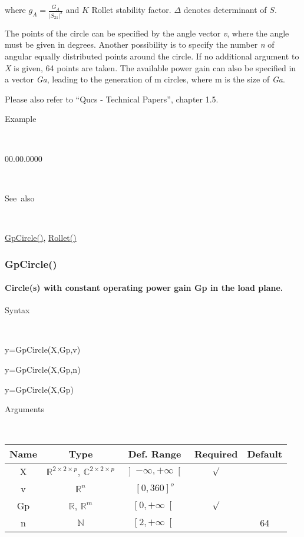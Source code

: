\medskip{}
where $g_{A}={\displaystyle \frac{G_{A}}{\left|S_{21}\right|^{2}}}$
and $K$ Rollet stability factor. $\Delta$ denotes determinant of
$S$.
\medskip{}

\noindent The points of the circle can be specified by the angle vector
\textit{v}, where the angle must be given in degrees. Another possibility
is to specify the number \textit{n} of angular equally distributed
points around the circle. If no additional argument to \textit{X}
is given, 64 points are taken. The available power gain can also be
specified in a vector \textit{Ga}, leading to the generation of m
circles, where m is the size of \textit{Ga}.

\noindent Please also refer to {}``Qucs - Technical Papers'', chapter
1.5.

\begin{description}
\item [Example]~
\end{description}
\begin{lyxlist}{00.00.0000}
\item [\texttt{v=GaCircle(S)}]~
\end{lyxlist}
\begin{description}
\item [See~also]~
\end{description}
\textcolor{blue}{\hyperlink{GpCircle}{GpCircle()}}\textcolor{black}{,}
\textcolor{blue}{\hyperlink{Rollet}{Rollet()}}


\newpage
\subsubsection*{\hypertarget{GpCircle}{}{\Large GpCircle()}}


\paragraph{\label{par:GpCircle}Circle(s) with constant operating power gain
Gp in the load plane.}

\begin{description}
\item [Syntax]~
\end{description}
y=GpCircle(X,Gp,v)

\noindent y=GpCircle(X,Gp,n)

\noindent y=GpCircle(X,Gp)

\begin{description}
\item [Arguments]~
\end{description}
\begin{tabular}{|c|c|c|c|c|}
\hline 
Name&
Type&
Def. Range&
Required&
Default\tabularnewline
\hline
\hline 
X&
$\mathbb{R}^{2\times2\times p}$, $\mathbb{C}^{2\times2\times p}$&
$\left]-\infty,+\infty\right[$&
$\surd$&
\tabularnewline
\hline
v&
$\mathbb{R}^{n}$ &
$\left[0,360\right]^{o}$&
&
\tabularnewline
\hline
Gp&
$\mathbb{R}$, $\mathbb{R}^{m}$&
$\left[0,+\infty\right[$&
$\surd$&
\tabularnewline
\hline
n&
$\mathbb{N}$&
$\left[2,+\infty\right[$&
&
64\tabularnewline
\hline
\end{tabular}

